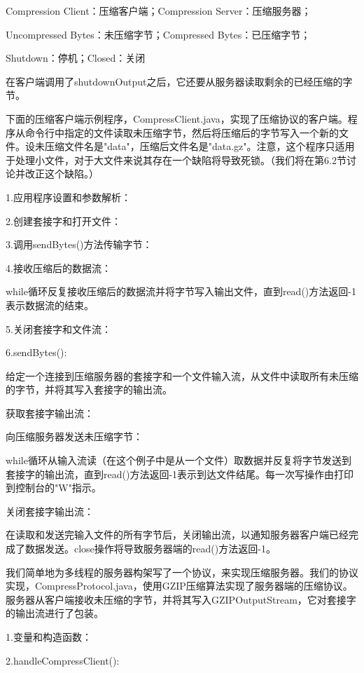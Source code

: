 	Compression Client：压缩客户端；Compression Server：压缩服务器；

	Uncompressed Bytes：未压缩字节；Compressed Bytes：已压缩字节；

	Shutdown：停机；Closed：关闭 

	在客户端调用了shutdownOutput之后，它还要从服务器读取剩余的已经压缩的字节。 

	下面的压缩客户端示例程序，CompressClient.java，实现了压缩协议的客户端。程序从命令行中指定的文件读取未压缩字节，然后将压缩后的字节写入一个新的文件。设未压缩文件名是"data"，压缩后文件名是"data.gz"。注意，这个程序只适用于处理小文件，对于大文件来说其存在一个缺陷将导致死锁。（我们将在第6.2节讨论并改正这个缺陷。） 

	

	1.应用程序设置和参数解析：

	2.创建套接字和打开文件：

	3.调用sendBytes()方法传输字节：

	4.接收压缩后的数据流：

	while循环反复接收压缩后的数据流并将字节写入输出文件，直到read()方法返回-1表示数据流的结束。 

	5.关闭套接字和文件流：

	6.sendBytes():

	给定一个连接到压缩服务器的套接字和一个文件输入流，从文件中读取所有未压缩的字节，并将其写入套接字的输出流。 

	获取套接字输出流：

	向压缩服务器发送未压缩字节：

	while循环从输入流读（在这个例子中是从一个文件）取数据并反复将字节发送到套接字的输出流，直到read()方法返回-1表示到达文件结尾。每一次写操作由打印到控制台的"W"指示。 

	关闭套接字输出流：

	在读取和发送完输入文件的所有字节后，关闭输出流，以通知服务器客户端已经完成了数据发送。close操作将导致服务器端的read()方法返回-1。 

	我们简单地为多线程的服务器构架写了一个协议，来实现压缩服务器。我们的协议实现，CompressProtocol.java，使用GZIP压缩算法实现了服务器端的压缩协议。服务器从客户端接收未压缩的字节，并将其写入GZIPOutputStream，它对套接字的输出流进行了包装。 

	

	1.变量和构造函数：

	2.handleCompressClient():

